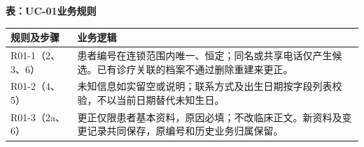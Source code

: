 \documentclass[UTF8,a4paper,zihao=-4,fontset=none]{ctexart}
\begin{document}
\medskip
{\small\setlength{\tabcolsep}{3pt}\renewcommand{\arraystretch}{1.10}
\noindent\textbf{表\thetable：UC-01业务规则}\par\smallskip
\noindent\begin{tabular}{@{}>{\raggedright\arraybackslash}p{3.4cm}>{\raggedright\arraybackslash}p{12.3cm}@{}}
\toprule
规则及步骤 & 业务逻辑 \\ \midrule
R01-1（2、3、6） & 患者编号在连锁范围内唯一、恒定；同名或共享电话仅产生候选。已有诊疗关联的档案不通过删除重建来更正。 \\
R01-2（4、5） & 未知信息如实留空或说明；联系方式及出生日期按字段列表校验，不以当前日期替代未知生日。 \\
R01-3（2a、6） & 更正仅限患者基本资料，原因必填；不改临床正文。新资料及变更记录共同保存，原编号和历史业务归属保留。 \\
\bottomrule
\end{tabular}\par}
\medskip
\endgroup
\clearpage
\end{document}
